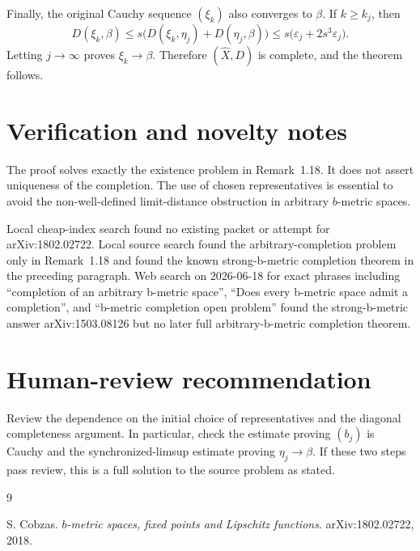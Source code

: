 \documentclass[11pt]{article}
\begin{document}
Finally, the original Cauchy sequence \((\xi_k)\) also converges to \(\beta\).
If \(k\ge k_j\), then
\[
        D(\xi_k,\beta)
        \le s\bigl(D(\xi_k,\eta_j)+D(\eta_j,\beta)\bigr)
        \le s\bigl(\varepsilon_j+2s^3\varepsilon_j\bigr).
\]
Letting \(j\to\infty\) proves \(\xi_k\to\beta\).  Therefore
\((\widehat X,D)\) is complete, and the theorem follows.

\section*{Verification and novelty notes}

The proof solves exactly the existence problem in Remark~1.18.  It does not
assert uniqueness of the completion.  The use of chosen representatives is
essential to avoid the non-well-defined limit-distance obstruction in
arbitrary \(b\)-metric spaces.

Local cheap-index search found no existing packet or attempt for
arXiv:1802.02722.  Local source search found the arbitrary-completion problem
only in Remark~1.18 and found the known strong-b-metric completion theorem in
the preceding paragraph.  Web search on 2026-06-18 for exact phrases including
``completion of an arbitrary b-metric space'', ``Does every b-metric space
admit a completion'', and ``b-metric completion open problem'' found the
strong-b-metric answer arXiv:1503.08126 but no later full arbitrary-b-metric
completion theorem.

\section*{Human-review recommendation}

Review the dependence on the initial choice of representatives and the
diagonal completeness argument.  In particular, check the estimate proving
\((b_j)\) is Cauchy and the synchronized-limsup estimate proving
\(\eta_j\to\beta\).  If these two steps pass review, this is a full solution
to the source problem as stated.

\begin{thebibliography}{9}

S. Cobzas.
\newblock \emph{\(b\)-metric spaces, fixed points and Lipschitz functions}.
\newblock arXiv:1802.02722, 2018.

\end{thebibliography}
\end{document}
